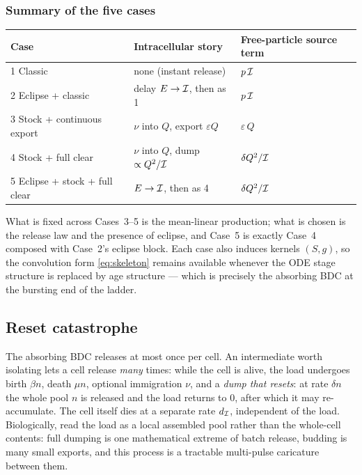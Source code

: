 \subsubsection{Summary of the five cases}

\begin{center}
\renewcommand{\arraystretch}{1.25}
\small
\begin{tabular}{@{}p{}p{}p{}@{}}
\toprule
Case & Intracellular story & Free-particle source term \\
\midrule
1 Classic & none (instant release) & $p\,\mathcal{I}$ \\
2 Eclipse + classic & delay $E\to\mathcal{I}$, then as 1 & $p\,\mathcal{I}$ \\
3 Stock + continuous export & $\nu$ into $Q$, export $\varepsilon Q$ & $\varepsilon\,Q$ \\
4 Stock + full clear & $\nu$ into $Q$, dump $\propto Q^2/\mathcal{I}$ & $\delta Q^2/\mathcal{I}$ \\
5 Eclipse + stock + full clear & $E\to\mathcal{I}$, then as 4 & $\delta Q^2/\mathcal{I}$ \\
\bottomrule
\end{tabular}
\end{center}
What is fixed across Cases~3--5 is the mean-linear production; what is
chosen is the release law and the presence of eclipse, and Case~5 is
exactly Case~4 composed with Case~2's eclipse block. Each case also induces
kernels $(S,g)$, so the convolution form \eqref{eq:skeleton} remains
available whenever the ODE stage structure is replaced by age structure ---
which is precisely the absorbing BDC at the bursting end of the ladder.

\subsection{Reset catastrophe}
\label{sec:reset}

The absorbing BDC releases at most once per cell. An intermediate worth
isolating lets a cell release \emph{many} times: while the cell is alive,
the load undergoes birth $\beta n$, death $\mu n$, optional immigration
$\nu$, and a \emph{dump that resets}: at rate $\delta n$ the whole pool $n$
is released and the load returns to $0$, after which it may re-accumulate.
The cell itself dies at a separate rate $d_{\mathcal{I}}$, independent of the
load. Biologically, read the load as a local assembled pool rather than the
whole-cell contents: full dumping is one mathematical extreme of batch
release, budding is many small exports, and this process is a tractable
multi-pulse caricature between them.

